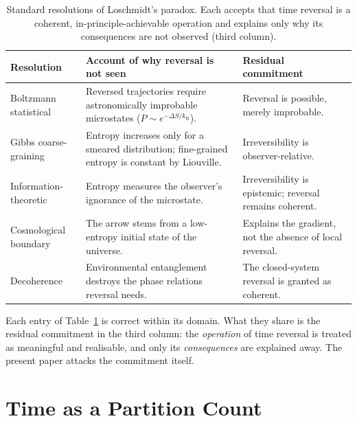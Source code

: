 \documentclass[11pt,a4paper]{article}
\theoremstyle{thmstyle}
\theoremstyle{definition}
\theoremstyle{remark}
\newcommand{\kB}{k_{\mathrm{B}}}
\begin{document}
\begin{table}[t]
\centering
\small
\caption{Standard resolutions of Loschmidt's paradox. Each accepts that
time reversal is a coherent, in-principle-achievable operation and
explains only why its consequences are not observed (third column).}
\label{tab:standard}
\begin{tabular}{p{}p{}p{}}
\toprule
\textbf{Resolution} & \textbf{Account of why reversal is not seen} &
\textbf{Residual commitment} \\
\midrule
Boltzmann statistical \citep{boltzmann1877} &
Reversed trajectories require astronomically improbable microstates
($P\sim e^{-\Delta S/\kB}$). &
Reversal is possible, merely improbable. \\
\addlinespace
Gibbs coarse-graining \citep{gibbs1902} &
Entropy increases only for a smeared distribution; fine-grained entropy
is constant by Liouville. &
Irreversibility is observer-relative. \\
\addlinespace
Information-theoretic \citep{jaynes1957} &
Entropy measures the observer's ignorance of the microstate. &
Irreversibility is epistemic; reversal remains coherent. \\
\addlinespace
Cosmological boundary \citep{penrose1989,penrose2004} &
The arrow stems from a low-entropy initial state of the universe. &
Explains the gradient, not the absence of local reversal. \\
\addlinespace
Decoherence \citep{zurek2003} &
Environmental entanglement destroys the phase relations reversal needs. &
The closed-system reversal is granted as coherent. \\
\bottomrule
\end{tabular}
\end{table}

Each entry of Table~\ref{tab:standard} is correct within its domain.
What they share is the residual commitment in the third column: the
\emph{operation} of time reversal is treated as meaningful and
realisable, and only its \emph{consequences} are explained away. The
present paper attacks the commitment itself.

\section{Time as a Partition Count}
\label{sec:partition}
\end{document}
